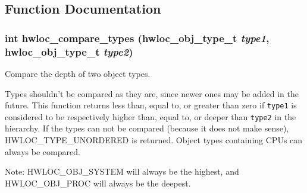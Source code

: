 \subsection{Function Documentation}
\hypertarget{group__hwlocality__types_g1820ea0dfd8e9dca28f9ea7624df5ae2}{
\subsubsection[{hwloc\_\-compare\_\-types}]{\setlength{\rightskip}{0pt plus 5cm}int hwloc\_\-compare\_\-types ({\bf hwloc\_\-obj\_\-type\_\-t} {\em type1}, \/  {\bf hwloc\_\-obj\_\-type\_\-t} {\em type2})}}
\label{group__hwlocality__types_g1820ea0dfd8e9dca28f9ea7624df5ae2}


Compare the depth of two object types. 

Types shouldn't be compared as they are, since newer ones may be added in the future. This function returns less than, equal to, or greater than zero if {\tt type1} is considered to be respectively higher than, equal to, or deeper than {\tt type2} in the hierarchy. If the types can not be compared (because it does not make sense), HWLOC\_\-TYPE\_\-UNORDERED is returned. Object types containing CPUs can always be compared.

\begin{Desc}
\item[Note:]HWLOC\_\-OBJ\_\-SYSTEM will always be the highest, and HWLOC\_\-OBJ\_\-PROC will always be the deepest. \end{Desc}
